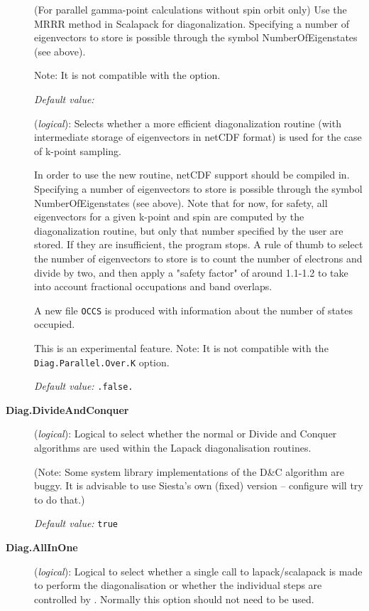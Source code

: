 \begin{description}
(For parallel gamma-point calculations without spin orbit only)
Use the MRRR method in Scalapack for diagonalization.
Specifying a number of eigenvectors to store is possible through
the symbol NumberOfEigenstates (see above).

Note: It is not compatible with the  option.

\textit{Default value:} \fdffalse

\item[\fdf{Use.New.Diagk}] (\textit{logical}):
Selects whether a more efficient diagonalization routine (with
intermediate storage of eigenvectors in netCDF format) is
used for the case of k-point sampling.

In order to use the new routine, netCDF support should be compiled in.
Specifying a number of eigenvectors to store is possible through
the symbol NumberOfEigenstates (see above). Note that for now, for safety, all
eigenvectors for a given k-point and spin are computed by the
diagonalization routine, but only that number specified by the user
are stored. If they are insufficient, the program stops.  A rule of
thumb to select the number of eigenvectors to store is to count the
number of electrons and divide by two, and then apply a "safety
factor" of around 1.1-1.2 to take into account fractional occupations
and band overlaps.

A new file \texttt{OCCS} is produced with information about the number of
states occupied.

This is an experimental feature. Note: It is not compatible with the
\texttt{Diag.Parallel.Over.K} option.

\textit{Default value:} \texttt{.false.}


\item[\textbf{Diag.DivideAndConquer}] (\textit{logical}):
Logical to select whether the normal or Divide and Conquer algorithms are
used within the Lapack diagonalisation routines.

(Note: Some system library implementations of the D\&C algorithm are
buggy. It is advisable to use Siesta's own (fixed) version -- configure will
try to do that.)

\textit{Default value:} \texttt{true}

\item[\textbf{Diag.AllInOne}] (\textit{logical}):
Logical to select whether a single call to lapack/scalapack is made to
perform the diagonalisation or whether the individual steps are controlled
by \siesta. Normally this option should not need to be used.


\end{description}
